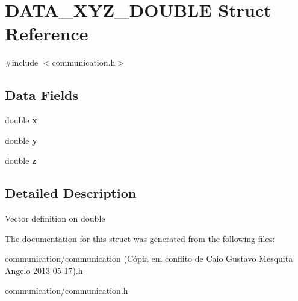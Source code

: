\hypertarget{structDATA__XYZ__DOUBLE}{
\section{DATA\_\-XYZ\_\-DOUBLE Struct Reference}
\label{structDATA__XYZ__DOUBLE}
}


{\ttfamily \#include $<$communication.h$>$}

\subsection*{Data Fields}
\begin{DoxyCompactItemize}
\item 
\hypertarget{structDATA__XYZ__DOUBLE_a22868cc99a423900e7b82d015a5eb91f}{
double {\bfseries x}}
\label{structDATA__XYZ__DOUBLE_a22868cc99a423900e7b82d015a5eb91f}

\item 
\hypertarget{structDATA__XYZ__DOUBLE_a198a27b5df3b5b0bf461b0e481e22a82}{
double {\bfseries y}}
\label{structDATA__XYZ__DOUBLE_a198a27b5df3b5b0bf461b0e481e22a82}

\item 
\hypertarget{structDATA__XYZ__DOUBLE_a9556e8868c223ff3e28756ea18a284c0}{
double {\bfseries z}}
\label{structDATA__XYZ__DOUBLE_a9556e8868c223ff3e28756ea18a284c0}

\end{DoxyCompactItemize}


\subsection{Detailed Description}
Vector definition on double 

The documentation for this struct was generated from the following files:\begin{DoxyCompactItemize}
\item 
communication/communication (Cópia em conflito de Caio Gustavo Mesquita Angelo 2013-\/05-\/17).h\item 
communication/communication.h\end{DoxyCompactItemize}
